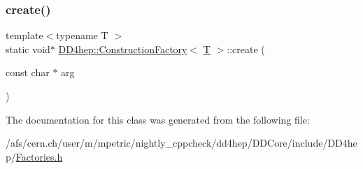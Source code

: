 \subsubsection{\texorpdfstring{create()}{create()}}
{\footnotesize\ttfamily template$<$typename T $>$ \\
static void$\ast$ \hyperlink{class_d_d4hep_1_1_construction_factory}{D\+D4hep\+::\+Construction\+Factory}$<$ \hyperlink{class_t}{T} $>$\+::create (\begin{DoxyParamCaption}\item[{const char $\ast$}]{arg }\end{DoxyParamCaption})\hspace{0.3cm}{\ttfamily [static]}}



The documentation for this class was generated from the following file\+:\begin{DoxyCompactItemize}
\item 
/afs/cern.\+ch/user/m/mpetric/nightly\+\_\+cppcheck/dd4hep/\+D\+D\+Core/include/\+D\+D4hep/\hyperlink{_d_d_core_2include_2_d_d4hep_2_factories_8h}{Factories.\+h}\end{DoxyCompactItemize}
